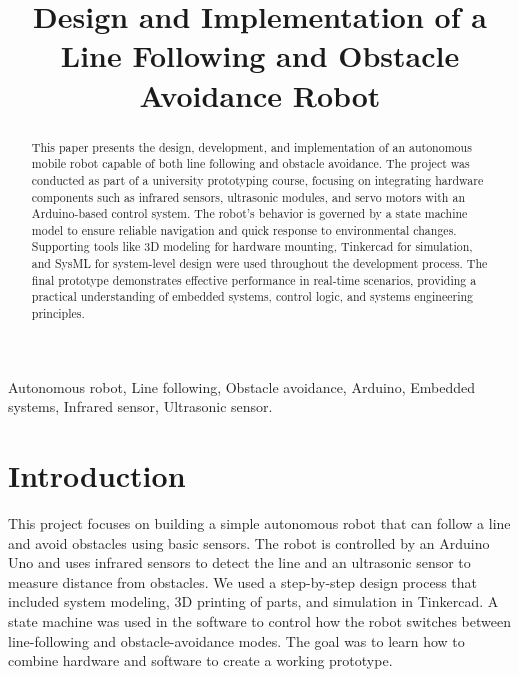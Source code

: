 \documentclass[conference]{IEEEtran}
\begin{document}
    \title{Design and Implementation of a Line Following and Obstacle Avoidance Robot}

    \author{
    }

    \maketitle

    \begin{abstract}
        This paper presents the design, development, and implementation of an autonomous mobile robot capable of both line following and obstacle avoidance. The project was conducted as part of a university prototyping course, focusing on integrating hardware components such as infrared sensors, ultrasonic modules, and servo motors with an Arduino-based control system. The robot's behavior is governed by a state machine model to ensure reliable navigation and quick response to environmental changes. Supporting tools like 3D modeling for hardware mounting, Tinkercad for simulation, and SysML for system-level design were used throughout the development process. The final prototype demonstrates effective performance in real-time scenarios, providing a practical understanding of embedded systems, control logic, and systems engineering principles.
    \end{abstract}

    \begin{IEEEkeywords}
        Autonomous robot, Line following, Obstacle avoidance, Arduino, Embedded systems, Infrared sensor, Ultrasonic sensor.
    \end{IEEEkeywords}

    \section{Introduction}\label{sec:introduction}

    This project focuses on building a simple autonomous robot that can follow a line and avoid obstacles using basic sensors. The robot is controlled by an Arduino Uno and uses infrared sensors to detect the line and an ultrasonic sensor to measure distance from obstacles. We used a step-by-step design process that included system modeling, 3D printing of parts, and simulation in Tinkercad. A state machine was used in the software to control how the robot switches between line-following and obstacle-avoidance modes. The goal was to learn how to combine hardware and software to create a working prototype.
\end{document}
